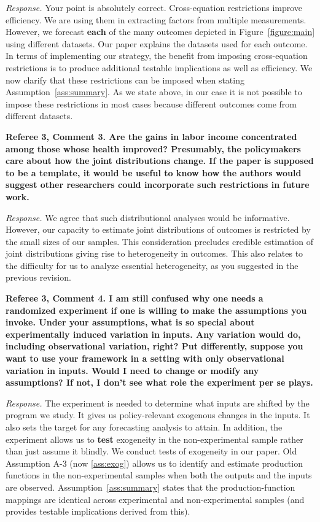 \noindent \textit{Response.} Your point is absolutely correct. Cross-equation restrictions improve efficiency. We are using them in extracting factors from multiple measurements. However, we forecast \textbf{each} of the many outcomes depicted in Figure~\ref{figure:main} using different datasets. Our paper explains the datasets used for each outcome. In terms of implementing our  strategy, the benefit from imposing cross-equation restrictions is to produce additional testable implications as well as efficiency. We now clarify that these restrictions can be imposed when stating Assumption~\ref{ass:summary}. As we state above, in our case it is not possible to impose these restrictions in most cases because different outcomes come from different datasets.

\noindent \textbf{Referee 3, Comment 3. Are the gains in labor income concentrated among those whose health improved? Presumably, the policymakers care about how the joint distributions change. If the paper is supposed to be a template, it would be useful to know how the authors would suggest other researchers could incorporate such restrictions in future work.}

\noindent \textit{Response.} We agree that such distributional analyses would be informative. However, our capacity to estimate joint distributions of outcomes is restricted by the small sizes of our samples. This consideration precludes credible estimation of joint distributions giving rise to heterogeneity in outcomes. This also relates to the difficulty for us to analyze essential heterogeneity, as you suggested in the previous revision.

\noindent \textbf{Referee 3, Comment 4. I am still confused why one needs a randomized experiment if one is willing to make the assumptions you invoke. Under your assumptions, what is so special about experimentally induced variation in inputs. Any variation would do, including observational variation, right? Put differently, suppose you want to use your framework in a setting with only observational variation in inputs. Would I need to change or modify any assumptions? If not, I don't see what role the experiment per se plays.}

\noindent \textit{Response.} The experiment is needed to determine what inputs are shifted by the program we study. It gives us policy-relevant exogenous changes in the inputs. It also sets the target for any forecasting analysis to attain. In addition, the experiment allows us to \textbf{test} exogeneity in the non-experimental sample rather than just assume it blindly. We conduct tests of exogeneity in our paper. Old Assumption A-3 (now \ref{ass:exog}) allows us to identify and estimate production functions in the non-experimental samples when both the outputs and the inputs are observed. Assumption~\ref{ass:summary} states that the production-function mappings are identical across experimental and non-experimental samples (and provides testable implications derived from this).

